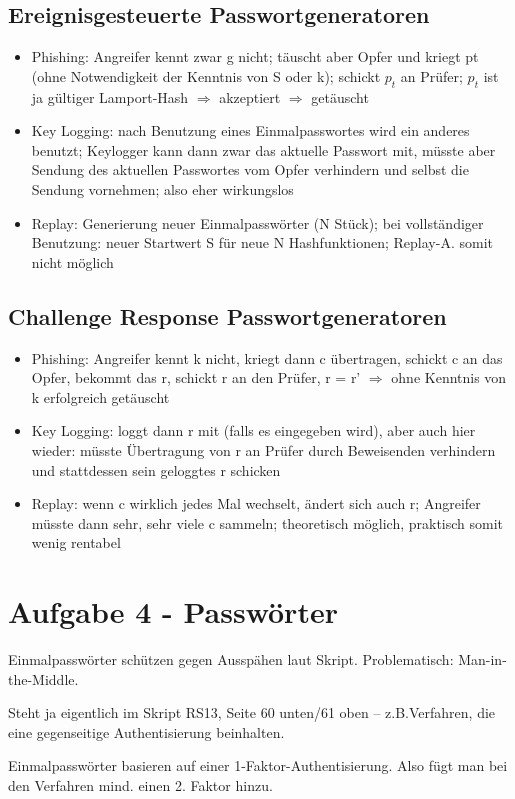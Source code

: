 \documentclass{scrartcl}
\begin{document}
\subsection*{Ereignisgesteuerte Passwortgeneratoren}
\begin{itemize}
  \item  Phishing: Angreifer kennt zwar g nicht; täuscht aber Opfer und kriegt pt (ohne Notwendigkeit der 
  Kenntnis von S oder k); schickt  $p_{t}$ an Prüfer;  $p_{t}$ ist ja gültiger Lamport-Hash $\Rightarrow$  
  akzeptiert $\Rightarrow$  getäuscht
  \item Key Logging:  nach Benutzung eines Einmalpasswortes wird ein anderes benutzt; Keylogger kann dann zwar das
  aktuelle Passwort mit, müsste aber Sendung des aktuellen Passwortes vom Opfer verhindern und selbst die Sendung
  vornehmen; also eher wirkungslos
  \item Replay:  Generierung neuer Einmalpasswörter (N Stück); bei vollständiger Benutzung: neuer Startwert 
  S für neue N Hashfunktionen; Replay-A. somit nicht möglich
\end{itemize}

\subsection*{Challenge Response Passwortgeneratoren}
\begin{itemize}
\item  Phishing: Angreifer kennt k nicht, kriegt dann c übertragen, schickt c an das Opfer, bekommt das 
r, schickt r an den Prüfer, r = r' $\Rightarrow$  ohne Kenntnis von k erfolgreich getäuscht
\item Key Logging: loggt dann r mit (falls es eingegeben wird), aber auch hier wieder: müsste Übertragung 
von r an Prüfer durch Beweisenden verhindern und stattdessen sein geloggtes r schicken
\item Replay: wenn c wirklich jedes Mal wechselt, ändert sich auch r; Angreifer müsste dann sehr, sehr 
viele c sammeln; theoretisch möglich, praktisch somit wenig rentabel
\end{itemize}

\section*{Aufgabe 4 - Passwörter}


Einmalpasswörter schützen gegen Ausspähen laut Skript. Problematisch: Man-in-the-Middle.
\newline

Steht ja eigentlich im Skript RS13, Seite 60 unten/61 oben –  z.B.Verfahren, die eine gegenseitige 
Authentisierung beinhalten.
\newline

Einmalpasswörter basieren auf einer 1-Faktor-Authentisierung. Also fügt man bei den Verfahren mind. einen 2. Faktor
hinzu.
\end{document}
